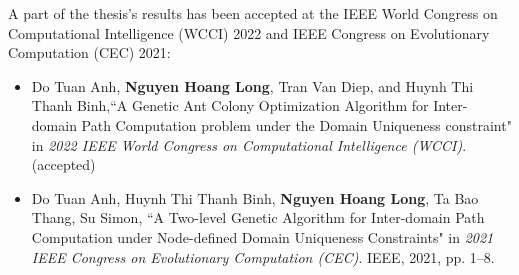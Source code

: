 A part of the thesis's results has been accepted at the IEEE World Congress on Computational Intelligence (WCCI) 2022 and IEEE Congress on Evolutionary Computation (CEC) 2021:
\begin{itemize}
	\item Do Tuan Anh, \textbf{Nguyen Hoang Long}, Tran Van Diep, and Huynh Thi Thanh Binh,``A Genetic Ant Colony Optimization Algorithm for Inter-domain Path Computation problem under the Domain Uniqueness constraint" in \textit{2022 IEEE World Congress on Computational Intelligence (WCCI)}. (accepted)
	\item Do Tuan Anh, Huynh Thi Thanh Binh, \textbf{Nguyen Hoang Long}, Ta Bao Thang, Su Simon, ``A Two-level Genetic Algorithm for Inter-domain Path Computation under Node-defined Domain Uniqueness Constraints" in \textit{2021 IEEE Congress on Evolutionary Computation (CEC)}. IEEE, 2021, pp. 1–8.
\end{itemize}